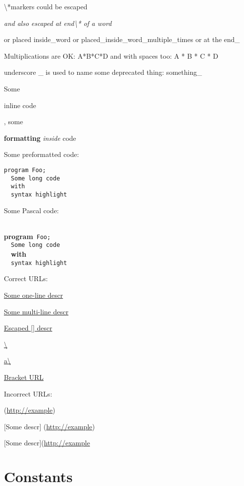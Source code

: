 \documentclass{report}
\newif\ifpdf
\begin{document}
{\textbackslash}*markers could be escaped

\textit{and also escaped at end{\textbackslash}* of a word}

or placed inside{\_}word or placed{\_}inside{\_}word{\_}multiple{\_}times or at the end{\_}

Multiplications are OK: A*B*C*D and with spaces too: A * B * C * D

underscore {\_} is used to name some deprecated thing: something{\_}

Some \begin{ttfamily}inline code\end{ttfamily}, some \begin{ttfamily}\textbf{formatting} \textit{inside} code\end{ttfamily}

Some preformatted code:

\begin{verbatim}
program Foo;
  Some long code
  with
  syntax highlight\end{verbatim}

Some Pascal code:

\texttt{\\\nopagebreak[3]
}\textbf{program}\texttt{~Foo;\\\nopagebreak[3]
~~Some~long~code\\\nopagebreak[3]
~~}\textbf{with}\texttt{\\\nopagebreak[3]
~~syntax~highlight\\
}

Correct URLs:

\href{http://example}{Some one-line descr}

\href{http://example}{Some multi-line
   descr}

\href{http://example}{Escaped [] descr}

\href{http://example}{{\textbackslash}}

\href{http://example}{a{\textbackslash}}

\href{http://example/(foo)}{Bracket URL}

Incorrect URLs:

(\href{http://example}{http://example})

[Some descr] (\href{http://example}{http://example})

[Some descr](\href{http://example}{http://example}
\section{Constants}
\ifpdf
\end{document}
